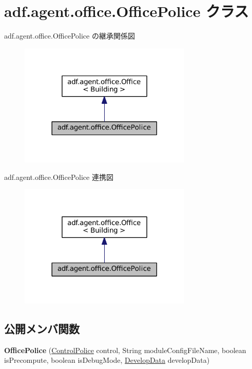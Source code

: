 \hypertarget{classadf_1_1agent_1_1office_1_1OfficePolice}{}\section{adf.\+agent.\+office.\+Office\+Police クラス}
\label{classadf_1_1agent_1_1office_1_1OfficePolice}


adf.\+agent.\+office.\+Office\+Police の継承関係図
\nopagebreak
\begin{figure}[H]
\begin{center}
\leavevmode
\includegraphics[width=233pt]{classadf_1_1agent_1_1office_1_1OfficePolice__inherit__graph}
\end{center}
\end{figure}


adf.\+agent.\+office.\+Office\+Police 連携図
\nopagebreak
\begin{figure}[H]
\begin{center}
\leavevmode
\includegraphics[width=233pt]{classadf_1_1agent_1_1office_1_1OfficePolice__coll__graph}
\end{center}
\end{figure}
\subsection*{公開メンバ関数}
\begin{DoxyCompactItemize}
\item 
\hypertarget{classadf_1_1agent_1_1office_1_1OfficePolice_a7ec353591cc41b38c48f7674d7efdd37}{}\label{classadf_1_1agent_1_1office_1_1OfficePolice_a7ec353591cc41b38c48f7674d7efdd37} 
{\bfseries Office\+Police} (\hyperlink{classadf_1_1component_1_1control_1_1ControlPolice}{Control\+Police} control, String module\+Config\+File\+Name, boolean is\+Precompute, boolean is\+Debug\+Mode, \hyperlink{classadf_1_1agent_1_1develop_1_1DevelopData}{Develop\+Data} develop\+Data)
\end{DoxyCompactItemize}
